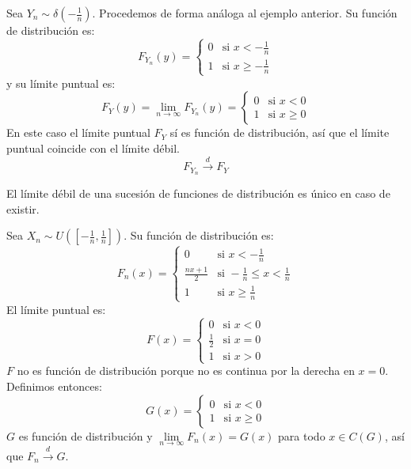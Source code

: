 \begin{example}
    Sea $Y_n \sim \delta(-\frac{1}{n})$.
    Procedemos de forma análoga al ejemplo anterior.
    Su función de distribución es:
    $$F_{Y_n}(y) = \begin{cases}
            0 & \text{si } x < -\frac{1}{n}    \\
            1 & \text{si } x \geq -\frac{1}{n}
        \end{cases}$$
    y su límite puntual es:
    $$F_Y(y) = \lim\limits_{n \to \infty} F_{Y_n}(y) = \begin{cases}
            0 & \text{si } x < 0    \\
            1 & \text{si } x \geq 0
        \end{cases}$$
    En este caso el límite puntual $F_Y$ sí es función de distribución, así que el límite puntual coincide con el límite débil.
    $$F_{Y_n} \xrightarrow{d} F_Y$$
\end{example}

\begin{theorem}
    El límite débil de una sucesión de funciones de distribución es único en caso de existir.
\end{theorem}

\begin{example}
    Sea $X_n \sim U([-\frac{1}{n}, \frac{1}{n}])$.
    Su función de distribución es:
    $$F_n(x) = \begin{cases}
            0              & \text{si } x < -\frac{1}{n}                  \\
            \frac{nx+1}{2} & \text{si } -\frac{1}{n} \leq x < \frac{1}{n} \\
            1              & \text{si } x \geq \frac{1}{n}
        \end{cases}$$
    El límite puntual es:
    $$F(x) = \begin{cases}
            0           & \text{si } x < 0 \\
            \frac{1}{2} & \text{si } x = 0 \\
            1           & \text{si } x > 0
        \end{cases}$$
    $F$ no es función de distribución porque no es continua por la derecha en $x = 0$.
    Definimos entonces:
    $$G(x) = \begin{cases}
            0 & \text{si } x < 0    \\
            1 & \text{si } x \geq 0
        \end{cases}$$
    $G$ es función de distribución y $\lim\limits_{n \to \infty} F_n(x) = G(x)$ para todo $x \in C(G)$, así que $F_n \xrightarrow{d} G$.
\end{example}

